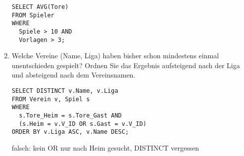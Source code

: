 \documentclass{lehramt-informatik-aufgabe}
\begin{document}
\begin{enumerate}
\begin{verbatim}
SELECT AVG(Tore)
FROM Spieler
WHERE
  Spiele > 10 AND
  Vorlagen > 3;
\end{verbatim}

%

\item Welche Vereine (Name, Liga) haben bisher schon mindestens einmal
unentschieden gespielt? Ordnen Sie das Ergebnis aufsteigend nach der
Liga und absteigend nach dem Vereinsnamen.

\begin{verbatim}
SELECT DISTINCT v.Name, v.Liga
FROM Verein v, Spiel s
WHERE
  s.Tore_Heim = s.Tore_Gast AND
  (s.Heim = v.V_ID OR s.Gast = v.V_ID)
ORDER BY v.Liga ASC, v.Name DESC;
\end{verbatim}

falsch: kein OR nur nach Heim gesucht, DISTINCT vergessen
\end{enumerate}
\end{document}
